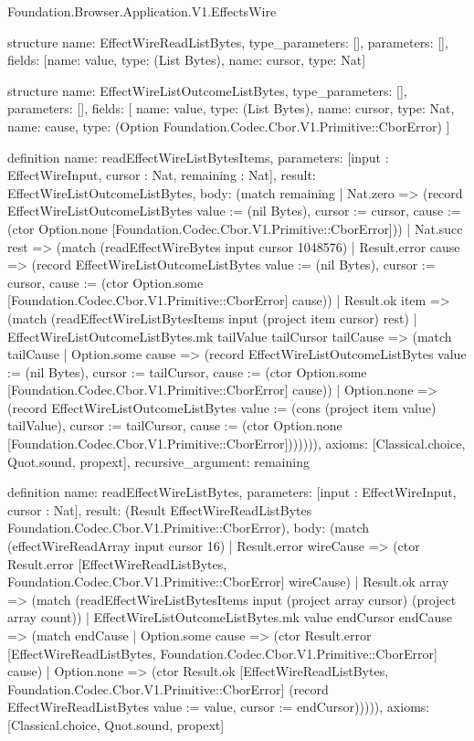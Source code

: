 \begin{lexlean}{Foundation.Browser.Application.V1.EffectsWire}
\begin{semanticmodule}
structure{
  name: EffectWireReadListBytes,
  type_parameters: [],
  parameters: [],
  fields: [{name: value, type: (List Bytes)}, {name: cursor, type: Nat}]
}

structure{
  name: EffectWireListOutcomeListBytes,
  type_parameters: [],
  parameters: [],
  fields: [
    {name: value, type: (List Bytes)},
    {name: cursor, type: Nat},
    {name: cause, type: (Option Foundation.Codec.Cbor.V1.Primitive::CborError)}
  ]
}

definition{
  name: readEffectWireListBytesItems,
  parameters: [input : EffectWireInput, cursor : Nat, remaining : Nat],
  result: EffectWireListOutcomeListBytes,
  body: (match remaining
    | Nat.zero => (record EffectWireListOutcomeListBytes {value := (nil Bytes), cursor := cursor, cause := (ctor Option.none [Foundation.Codec.Cbor.V1.Primitive::CborError])})
    | Nat.succ rest => (match (readEffectWireBytes input cursor 1048576)
      | Result.error cause => (record EffectWireListOutcomeListBytes {value := (nil Bytes), cursor := cursor, cause := (ctor Option.some [Foundation.Codec.Cbor.V1.Primitive::CborError] cause)})
      | Result.ok item => (match (readEffectWireListBytesItems input (project item cursor) rest)
        | EffectWireListOutcomeListBytes.mk tailValue tailCursor tailCause => (match tailCause
          | Option.some cause => (record EffectWireListOutcomeListBytes {value := (nil Bytes), cursor := tailCursor, cause := (ctor Option.some [Foundation.Codec.Cbor.V1.Primitive::CborError] cause)})
          | Option.none => (record EffectWireListOutcomeListBytes {value := (cons (project item value) tailValue), cursor := tailCursor, cause := (ctor Option.none [Foundation.Codec.Cbor.V1.Primitive::CborError])}))))),
  axioms: [Classical.choice, Quot.sound, propext],
  recursive_argument: remaining
}

definition{
  name: readEffectWireListBytes,
  parameters: [input : EffectWireInput, cursor : Nat],
  result: (Result EffectWireReadListBytes Foundation.Codec.Cbor.V1.Primitive::CborError),
  body: (match (effectWireReadArray input cursor 16)
    | Result.error wireCause => (ctor Result.error [EffectWireReadListBytes, Foundation.Codec.Cbor.V1.Primitive::CborError] wireCause)
    | Result.ok array => (match (readEffectWireListBytesItems input (project array cursor) (project array count))
      | EffectWireListOutcomeListBytes.mk value endCursor endCause => (match endCause
        | Option.some cause => (ctor Result.error [EffectWireReadListBytes, Foundation.Codec.Cbor.V1.Primitive::CborError] cause)
        | Option.none => (ctor Result.ok [EffectWireReadListBytes, Foundation.Codec.Cbor.V1.Primitive::CborError] (record EffectWireReadListBytes {value := value, cursor := endCursor}))))),
  axioms: [Classical.choice, Quot.sound, propext]
}


\end{semanticmodule}
\end{lexlean}
